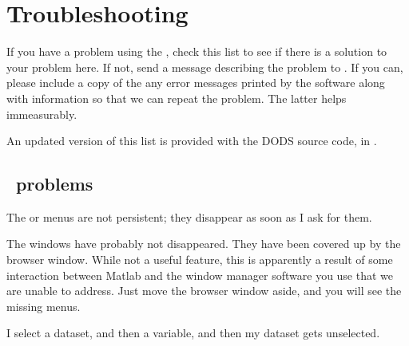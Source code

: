 %
%
%
%
%
%
%
%

\chapter{Troubleshooting}
\label{gui,trouble}



If you have a problem using the \GUI, check this list
to see if there is a solution to your problem here. If not, send a
message describing the problem to \DODSsupport . If you
can, please include a copy of the any error messages printed by the
software along with information so that we can repeat the problem. The
latter helps immeasurably.

An updated version of this list is provided with the DODS source code,
in \DODSroot{}.

\section{\GUI\ problems}

\problem The  or  menus are not
persistent; they disappear as soon as I ask for them.

\fix The windows have probably not disappeared. They have been covered
up by the browser window. While not a useful feature, this is
apparently a result of some interaction between Matlab and the window
manager software you use that we are unable to address. Just move the
browser window aside, and you will see the missing menus.

\problem  I select a dataset, and then a variable, and then my dataset
gets unselected.

